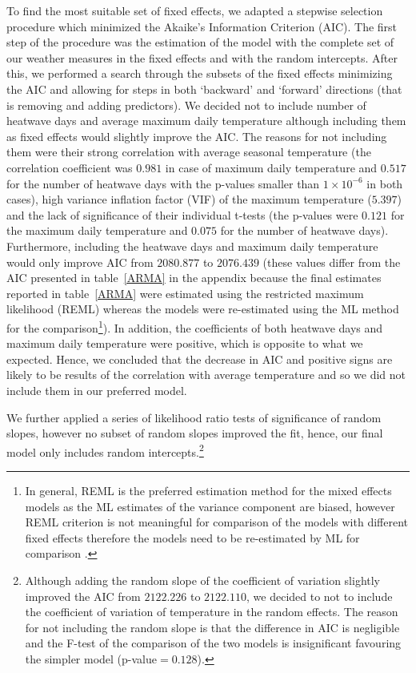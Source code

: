 \documentclass[12pt]{iopart}
\begin{document}
To find the most suitable set of fixed effects, we adapted a stepwise selection procedure which minimized the Akaike's Information Criterion (AIC). The first step of the procedure was the estimation of the model with the complete set of our weather measures in the fixed effects and with the random intercepts. After this, we performed a search through the subsets of the fixed effects minimizing the AIC and allowing for steps in both `backward' and `forward' directions (that is removing and adding predictors). We decided not to include number of heatwave days and average maximum daily temperature although including them as fixed effects would slightly improve the AIC. The reasons for not including them were their strong correlation with average seasonal temperature (the correlation coefficient was $0.981$ in case of maximum daily temperature and $0.517$ for the number of heatwave days with the p-values smaller than $1\times10^{-6}$ in both cases), high variance inflation factor (VIF) of the maximum temperature ($5.397$) and the lack of significance of their individual t-tests (the p-values were $0.121$ for the maximum daily temperature and $0.075$ for the number of heatwave days). Furthermore, including the heatwave days and maximum daily temperature would only improve AIC from $2080.877$ to $2076.439$ (these values differ from the AIC presented in table~\ref{ARMA} in the appendix because the final estimates reported in table~\ref{ARMA} were estimated using the restricted maximum likelihood (REML) whereas the models were re-estimated using the ML method for the comparison\footnote{In general, REML is the preferred estimation method for the mixed effects models as the ML estimates of the variance component are biased, however REML criterion is not meaningful for comparison of the models with different fixed effects therefore the models need to be re-estimated by ML for comparison \cite{Zuur2009}.}). In addition, the coefficients of both heatwave days and maximum daily temperature were positive, which is opposite to what we expected. Hence, we concluded that the decrease in AIC and positive signs are likely to be results of the correlation with average temperature and so we did not include them in our preferred model.

We further applied a series of likelihood ratio tests of significance of random slopes, however no subset of random slopes improved the fit, hence, our final model only includes random intercepts.\footnote{Although adding the random slope of the coefficient of variation slightly improved the AIC from $2122.226$ to $2122.110$, we decided to not to include the coefficient of variation of temperature in the random effects. The reason for not including the random slope is that the difference in AIC is negligible and the F-test of the comparison of the two models is insignificant favouring the simpler model (p-value$=0.128$).} 
\end{document}
